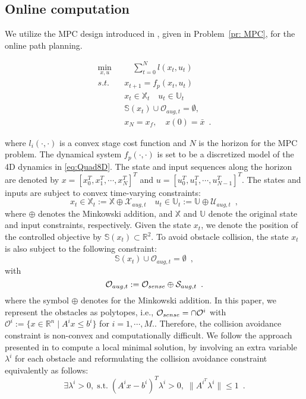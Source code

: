 \subsection{Online computation}
%
We utilize the MPC design introduced in \cite{zhang_2017_MPC}, given in Problem~\ref{pr: MPC}, for the online path planning.
%
\begin{problem}\label{pr: MPC}
\begin{align*}
\min_{x,u}  & \quad \sum^{N}_{t=0} l(x_t,u_t)  \\
s.t. \quad &x_{t+1} = f_p(x_t,u_t)\\
& x_t \in \mathbb{X}_t\quad u_t \in \mathbb{U}_t\\
& \mathbb{S}(x_t)\cup\mathcal{O}_{aug,t} = \emptyset,\\
& x_N = x_f ,\quad x(0) = \bar{x} \enspace.
\end{align*}
\end{problem}
\noindent where $l_i(\cdot,\cdot)$ is a  convex stage cost function and $N$ is the horizon for the MPC problem. The dynamical system $f_p(\cdot,\cdot)$ is set to be a discretized model of the 4D dynamics in \ref{eq:Quad8D}. The state and input sequences along the horizon  are denoted by $x=[x^{T}_0,x^{T}_1,\cdots,x^{T}_N]^{T}$ and $u=[u^{T}_0,u^{T}_1,\cdots,u^{T}_{N-1}]^{T}$. The states and inputs are subject to convex time-varying constraints:
%
\begin{equation}
x_t \in \mathbb{X}_t :=\mathbb{X}\oplus\mathcal{X}_{aug,t} \quad u_t \in\mathbb{U}_t := \mathbb{U}\oplus\mathcal{U}_{aug,t} \enspace ,
\end{equation}
%
where $\oplus$ denotes the Minkowski addition, and $\mathbb{X}$ and $\mathbb{U}$ denote the original state and input constraints, respectively. Given the state $x_t$, we denote the position of the controlled objective by $\mathbb{S}(x_t)\subset \mathbb{R}^{2}$. To avoid obstacle collision, the state $x_t$ is also subject to the following constraint: 
%
\begin{equation}
\mathbb{S}(x_t)\cup\mathcal{O}_{aug,t} = \emptyset \enspace ,
\end{equation}
%
with 
%
\begin{equation}
\mathcal{O}_{aug,t} := \mathcal{O}_{sense}\oplus\mathcal{S}_{aug,t} \enspace .
\end{equation}
%
where the symbol $\oplus$ denotes for the Minkowski addition.
%
In this paper, we represent the obstacles as polytopes, i.e., $\mathcal{O}_{sense} = \cap \mathcal{O}^{i}$ with $\mathcal{O}^{i}:= \{x\in\mathbb{R}^{n} \mid A^{i}x\leq b^{i}\}$ for $i = 1,\cdots ,M.$. Therefore, the collision avoidance constraint is non-convex and computationally difficult. We follow the approach presented in \cite{zhang_2017_MPC} to compute a local minimal solution, by involving an extra variable $\lambda^{i}$ for each obstacle and reformulating the collision avoidance constraint equivalently as follows: 
%
\begin{equation}
\exists \lambda^{i} >0, \; \mbox{s.t.} \; (A^{i}x- b^{i})^{T}\lambda^{i}  > 0, \; \|A^{i^{T}}\lambda^{i}\|\leq 1\enspace .
\end{equation}
%
